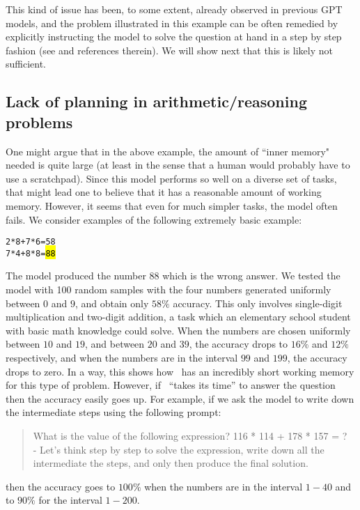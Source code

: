 %

%

%

This kind of issue has been, to some extent, already observed in previous GPT models, and the problem illustrated in this example can be often remedied by explicitly instructing the model to solve the question at hand in a step by step fashion (see \cite{wei2022chain} and references therein). We will show next that this is likely not sufficient.

\subsection{Lack of planning in arithmetic/reasoning problems}
One might argue that in the above example, the amount of ``inner memory" needed is quite large (at least in the sense that a human would probably have to use a scratchpad). Since this model performs so well on a diverse set of tasks, that might lead one to believe that it has a reasonable amount of working memory. However, it seems that even for much simpler tasks, the model often fails. We consider examples of the following extremely basic example: 

\begin{AIbox}{\DV}
\scriptsize\vspace{-5px}
\parbox{1\textwidth}{
\begin{alltt}

2 * 8 + 7 * 6 = 58 \\

7 * 4 + 8 * 8 = \hl{88}

\end{alltt}
}
\end{AIbox}

The model produced the number $88$ which is the wrong answer. We tested the model with 100 random samples with the four numbers generated uniformly between $0$ and $9$, and obtain only $58\%$ accuracy. This only involves single-digit multiplication and two-digit addition, a task which an elementary school student with basic math knowledge could solve. When the numbers are chosen uniformly between $10$ and $19$, and between $20$ and $39$, the accuracy drops to $16\%$ and $12\%$ respectively, and when the numbers are in the interval $99$ and $199$, the accuracy drops to zero. In a way, this shows how \DV\ has an incredibly short working memory for this type of problem. However, if \DV\ ``takes its time'' to answer the question then the accuracy easily goes up. For example, if we ask the model to write down the intermediate steps using the following prompt:
\begin{quote}
What is the value of the following expression? 116 * 114 + 178 * 157 = ? \\
- Let's think step by step to solve the expression, write down all the intermediate the steps, and only then produce the final solution.
\end{quote}
then the accuracy goes to $100\%$ when the numbers are in the interval $1-40$ and to $90\%$ for the interval $1-200$.

